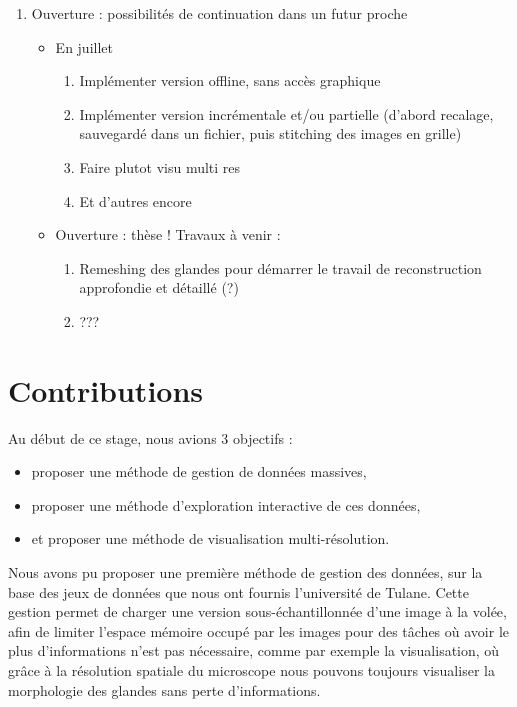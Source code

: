 {{\begin{enumerate}
\begin{itemize}
				\item problème perso : ne veut pas faire de petits pas, mais plutot un grand en + de tps
				\item ouverture : + de travail sur moi même \& ma facon de travailler (malheureusement, seule ouverture possible dans ce contexte)
			\end{itemize}
			\item Ouverture : possibilités de continuation dans un futur proche\begin{itemize}
				\item En juillet\begin{enumerate}
					\item Implémenter version offline, sans accès graphique
					\item Implémenter version incrémentale et/ou partielle (d'abord recalage, sauvegardé dans un fichier, puis stitching des images en grille)
					\item Faire plutot visu multi res
					\item Et d'autres encore
				\end{enumerate}
			\item Ouverture : thèse ! Travaux à venir :\begin{enumerate}
					\item Remeshing des glandes pour démarrer le travail de reconstruction approfondie et détaillé (?)
					\item ???
				\end{enumerate}
			\end{itemize}
		\end{enumerate}
	}
	\fi
	
	\section{Contributions}
	{
        Au début de ce stage, nous avions 3 objectifs :~\begin{itemize}
			\item proposer une méthode de gestion de données massives,
			\item proposer une méthode d'exploration interactive de ces données,
			\item et proposer une méthode de visualisation multi-résolution.
        \end{itemize}

        Nous avons pu proposer une première méthode de gestion des données, sur la base des jeux de données que nous ont fournis l'université de Tulane. Cette gestion permet de charger une version sous-échantillonnée d'une image à la volée, afin de limiter l'espace mémoire occupé par les images pour des tâches où avoir le plus d'informations n'est pas nécessaire, comme par exemple la visualisation, où grâce à la résolution spatiale du microscope nous pouvons toujours visualiser la morphologie des glandes sans perte d'informations.

}}
